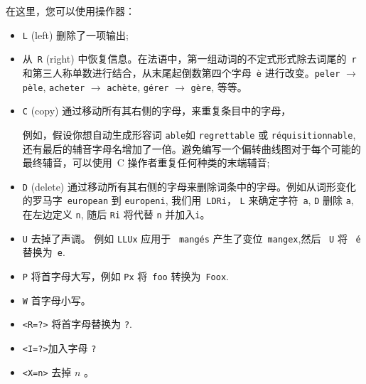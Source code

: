 在这里，您可以使用操作器：


\begin{itemize}
\item \verb+L+ (left) 删除了一项输出;
  	  
\item 从\ \verb+R+ (right) 中恢复信息。在法语中，第一组动词的不定式形式除去词尾的\ \verb+r+ 和第三人称单数进行结合，从末尾起倒数第四个字母\ \texttt{è} 进行改变。\verb+peler+ $\rightarrow$ \texttt{pèle},
  	  \verb+acheter+ $\rightarrow$ \texttt{achète}, \texttt{gérer}
  	  $\rightarrow$ \texttt{gère}, 等等。

  	  
\item \verb+C+ (copy) 通过移动所有其右侧的字母，来重复条目中的字母，
  	  
例如，假设你想自动生成形容词
\verb+able+如 \verb+regrettable+ 或 \verb+réquisitionnable+,
 还有最后的辅音字母名增加了一倍。避免编写一个偏转曲线图对于每个可能的最终辅音，可以使用\ C 操作者重复任何种类的末端辅音;
  
  \item \verb+D+ (delete) 通过移动所有其右侧的字母来删除词条中的字母。例如从词形变化的罗马字\  \verb+european+ 到 \verb+europeni+, 我们用\ \verb+LDRi+，  \verb+L+ 来确定字符\ \verb+a+, \verb+D+ 删除 \verb+a+, 在左边定义 \verb+n+, 随后 \verb+Ri+ 将代替 \verb+n+ 并加入\verb+i+。

\item \verb+U+ 去掉了声调。
	例如 \verb+LLUx+ 应用于
\ \texttt{mangés} 产生了变位\ \verb+mangex+,然后 \ \verb+U+
	将 \ \texttt{é} 替换为\  \verb+e+.

\item \verb+P+ 将首字母大写，例如
	\verb$Px$ 将\ \verb$foo$ 转换为\ \verb$Foox$.
  
\item \verb+W+ 首字母小写。

\item \verb+<R=?>+ 将首字母替换为 \verb+?+.

\item \verb+<I=?>+加入字母 \verb+?+

\item \verb+<X=n>+ 去掉 $n$ 。
\end{itemize}


